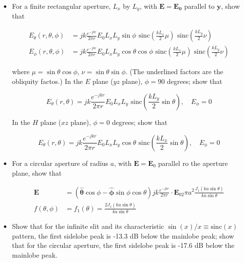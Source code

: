 \documentclass[letterpaper,10pt]{article}\usepackage[]{graphicx}\usepackage[]{color}
\newcommand{\question}[3]{
\begin{itemize}
\item[{\makebox[1cm]{#1)}}] #2

\vspace{.2in}

#3

\end{itemize}

\vspace{.2in}
}
\begin{document}
\question{2.10}{
For a finite rectangular aperture, $L_x$ by $L_y$, with $\boldsymbol{E}=\boldsymbol{E_0}$ parallel to $\boldsymbol{y}$, show that

\begin{align*}
E_\theta(r, \theta, \phi) & = jk\frac{e^{-jkr}}{2\pi r}E_0L_xL_y\sin\phi\text{ sinc}\left(\frac{kL_x}{2}\mu\right)\text{ sinc}\left(\frac{kL_y}{2}\nu\right) \\
E_\phi(r, \theta, \phi) & = jk\frac{e^{-jkr}}{2\pi r}E_0L_xL_y\cos\theta\cos\phi\text{ sinc}\left(\frac{kL_x}{2}\mu\right)\text{ sinc}\left(\frac{kL_y}{2}\nu\right)
\end{align*}

where $\mu=\sin\theta\cos\phi$, $\nu=\sin\theta\sin\phi$. (The underlined factors are the obliquity factos.)  In the $E$ plane ($yz$ plane), $\phi=90$ degrees; show that

\begin{equation*}
E_\theta(r,\theta) = jk\frac{e^{-jkr}}{2\pi r}E_0L_xL_y\text{ sinc}\left(\frac{kL_y}{2}\sin\theta\right), \quad E_\phi = 0
\end{equation*}

In the $H$ plane ($xz$ plane), $\phi=0$ degrees; show that

\begin{equation*}
E_\theta(r,\theta) = jk\frac{e^{-jkr}}{2\pi r}E_0L_xL_y\cos\theta\text{ sinc}\left(\frac{kL_x}{2}\sin\theta\right), \quad E_\phi = 0
\end{equation*}
}{}

\question{2.11}{
For a circular aperture of radius $a$, with $\boldsymbol{E}=\boldsymbol{E}_0$ parallel ro the aperture plane, show that

\begin{align*}
\boldsymbol{E} & = \left(\hat{\boldsymbol{\theta}}\cos\phi-\hat{\boldsymbol{\phi}}\sin\phi\cos\theta\right)jk\frac{e^{-jkr}}{2\pi r}\cdot \boldsymbol{E}_02\pi a^2\frac{J_1(ka\sin\theta)}{ka\sin\theta} \\
f(\theta,\phi) & = f_1(\theta) = \frac{2J_1(ka\sin\theta)}{ka\sin\theta}
\end{align*}
}{}

\question{2.12}{
Show that for the infinite slit and its characteristic $\sin(x)/x\equiv \text{sinc}(x)$ pattern, the first sidelobe peak is -13.3 dB below the mainlobe peak; show that for the circular aperture, the first sidelobe peak is -17.6 dB below the mainlobe peak.
}{}
\end{document}
